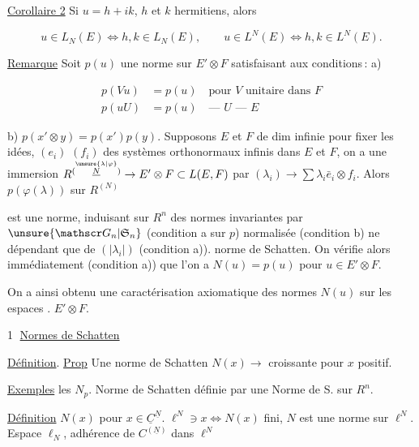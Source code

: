 
\uline{Corollaire 2} Si $u=h+ik$, $h$ et $k$ hermitiens, alors

\[
u\in L_N(E)\Longleftrightarrow h,k\in L_N(E),\qquad
u\in L^N(E)\Longleftrightarrow h,k\in L^N(E).
\]

\uline{Remarque} Soit $p(u)$ une norme sur $E'\otimes F$ satisfaisant aux conditions\,: a)

\[
\begin{aligned}
p(Vu)&=p(u)\quad\text{pour $V$ unitaire dans $F$}\\
p(uU)&=p(u)\quad\text{--- $U$ --- $E$}
\end{aligned}
\]

b) $p(x'\otimes y)=p(x')p(y)$. Supposons $E$ et $F$ de dim infinie pour fixer les idées,  $(e_i)$ $(f_i)$ des systèmes orthonormaux infinis dans $E$ et $F$, on a une immersion $R^{(\overset{\unsure{\lambda|\varphi}}{\underline N})}\to E'\otimes F\subset L(E,F)$ par $(\lambda_i)\to\sum\lambda_i\bar e_i\otimes f_i$. Alors $p(\varphi(\lambda))$ sur $R^{(N)}$

est une norme, induisant sur $R^n$ des normes  invariantes par $\unsure{\mathscr G_n|\mathfrak S_n}$ (condition a sur $p$) normalisée (condition b) ne dépendant que de $(|\lambda_i|)$ (condition a)).   norme de Schatten. On vérifie alors immédiatement (condition a)) que l'on a $N(u)=p(u)$ pour  $u\in E'\otimes F$.

On a ainsi obtenu une caractérisation axiomatique des normes $N(u)$ sur les espaces . $E'\otimes F$.





\textcircled{1} \uline{Normes de Schatten}

\uline{Définition}. \uline{Prop} Une norme de Schatten $N(x)\to$ croissante pour $x$ positif. 

\uline{Exemples} les $N_p$. Norme de Schatten définie par une Norme de S. sur $R^n$.

\uline{Définition} $N(x)$ pour $x\in\underline C^{\underline N}$. $\ell^N\ni x\Longleftrightarrow N(x)$ fini, $N$ est une norme sur $\ell^N$. Espace $\ell_N$, adhérence de $C^{(\underline N)}$ dans $\ell^N$

